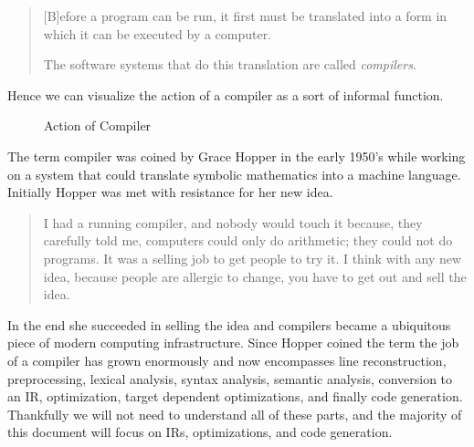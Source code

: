 \begin{quotation} %
    [B]efore a program can be run, it first must be translated into a form in which it can be executed by a computer.

    The software systems that do this translation are called \emph{compilers}.
\end{quotation}
Hence we can visualize the action of a compiler as a sort of informal function.
\begin{figure}[h]
    \centering
    \caption{Action of Compiler}
    \label{fig:compiler}
\end{figure}

The term compiler was coined by Grace Hopper in the early 1950's while working on a system that could translate symbolic mathematics into a machine language.
Initially Hopper was met with resistance for her new idea.
\begin{quotation}
    I had a running compiler, and nobody would touch it because, they carefully told me, computers could only do arithmetic; they could not do programs.
    It was a selling job to get people to try it.
    I think with any new idea, because people are allergic to change, you have to get out and sell the idea.
\end{quotation}
In the end she succeeded in selling the idea and compilers became a ubiquitous piece of modern computing infrastructure.
Since Hopper coined the term the job of a compiler has grown enormously and now encompasses line reconstruction, preprocessing, lexical analysis, syntax analysis, semantic analysis, conversion to an \ac{IR}, optimization, target dependent optimizations, and finally code generation.
Thankfully we will not need to understand all of these parts, and the majority of this document will focus on \aclp{IR}, optimizations, and code generation.

